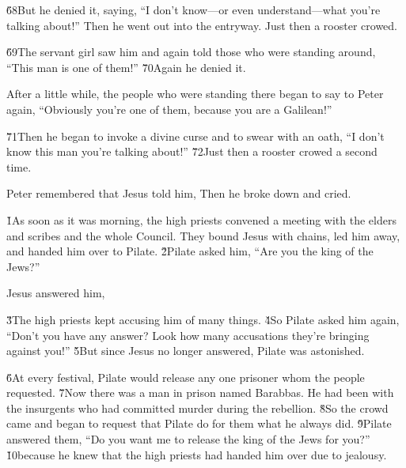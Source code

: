 \v{68}But he denied it, saying, ``I don't know---or even understand---what you're talking about!'' Then he went out into the entryway. Just then a rooster crowed.

\v{69}The servant girl saw him and again told those who were standing around, ``This man is one of them!'' \v{70}Again he denied it.

After a little while, the people who were standing there began to say to Peter again, ``Obviously you're one of them, because you are a Galilean!''

\v{71}Then he began to invoke a divine curse and to swear with an oath, ``I don't know this man you're talking about!'' \v{72}Just then a rooster crowed a second time.

Peter remembered that Jesus told him,  Then he broke down and cried.

\v{1}As soon as it was morning, the high priests convened a meeting with the elders and scribes and the whole Council. They bound Jesus with chains, led him away, and handed him over to Pilate. \v{2}Pilate asked him, ``Are you the king of the Jews?''

Jesus answered him, 

\v{3}The high priests kept accusing him of many things. \v{4}So Pilate asked him again, ``Don't you have any answer? Look how many accusations they're bringing against you!'' \v{5}But since Jesus no longer answered, Pilate was astonished.

\v{6}At every festival, Pilate would release any one prisoner whom the people requested. \v{7}Now there was a man in prison named Barabbas. He had been with the insurgents who had committed murder during the rebellion. \v{8}So the crowd came and began to request that Pilate do for them what he always did. \v{9}Pilate answered them, ``Do you want me to release the king of the Jews for you?'' \v{10}because he knew that the high priests had handed him over due to jealousy.


